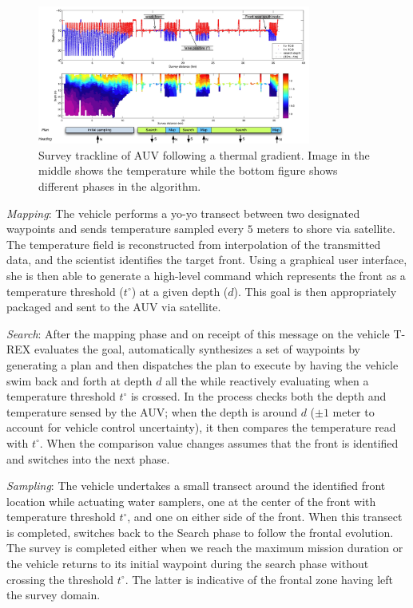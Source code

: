 \begin{figure}[b]
\centering
\includegraphics[width=0.8\textwidth]{figs/front-mi.jpg}
\caption{\small{Survey trackline of AUV following a thermal
    gradient. Image in the middle shows the temperature while the
    bottom figure shows different phases in the algorithm.}}
\label{fig:mi-front}
\end{figure}

\emph{Mapping}: The vehicle performs a yo-yo transect between two
designated waypoints and sends temperature sampled every $5$ meters to
shore via satellite. The temperature field is reconstructed from
interpolation of the transmitted data, and the scientist identifies
the target front. Using a graphical user interface, she is then able
to generate a high-level command which represents the front as a
temperature threshold ($t^{\circ}$) at a given depth ($d$). This goal is
then appropriately packaged and sent to the AUV via satellite.

\emph{Search}: After the mapping phase and on receipt of this message
on the vehicle T-REX evaluates the goal, automatically synthesizes a
set of waypoints by generating a plan and then dispatches the plan to
execute by having the vehicle swim back and forth at depth $d$ all the
while reactively evaluating when a temperature threshold $t^{\circ}$
is crossed. In the process \rx checks both the depth and temperature
sensed by the AUV; when the depth is around $d$ ($\pm 1$ meter to
account for vehicle control uncertainty), it then compares the
temperature read with $t^{\circ}$. When the comparison value changes \rx
assumes that the front is identified and switches into the next phase.

\emph{Sampling}: The vehicle undertakes a small transect around the
identified front location while actuating water samplers, one at the
center of the front with temperature threshold $t^{\circ}$, and one on
either side of the front. When this transect is completed, \rx
switches back to the Search phase to follow the frontal evolution.
The survey is completed either when we reach the maximum mission
duration or the vehicle returns to its initial waypoint during the
search phase without crossing the threshold $t^{\circ}$. The latter is
indicative of the frontal zone having left the survey domain.

